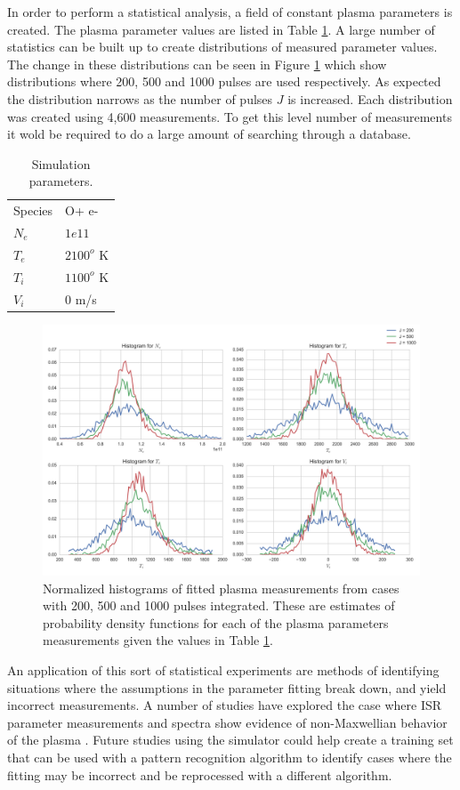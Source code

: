 \documentclass[draft,ras]{agutex}
\begin{document}
\begin{article}
In order to perform a statistical analysis, a field of constant plasma parameters is created. The plasma parameter values are listed in Table \ref{tb:param1}. A large number of statistics can be built up to create distributions of measured parameter values. The change in these distributions can be seen in Figure \ref{fig:statshistall} which show distributions where 200, 500 and 1000 pulses are used respectively. As expected the distribution narrows as the number of pulses $J$ is increased. Each distribution was created using 4,600 measurements. To get this level number of measurements it wold be required to do a large amount of searching through a database. 

\begin{table}[!t]
\centering
\caption{Simulation parameters.}
\label{tb:param1}
\begin{tabular}{ll}
Species & O+ e-\\
$N_e$    & $1e11$ \\
$T_e$      & $2100^o$ K   \\
$T_i$      & $1100^o$ K \\
$V_i$      & $0$ m/s
\end{tabular}
\end{table}

\begin{figure}[!t]
\centering
\includegraphics[width=5in]{datahist}
\caption{Normalized histograms of fitted plasma measurements from cases with 200, 500 and 1000 pulses integrated. These are estimates of probability density functions for each of the plasma parameters measurements given the values in Table \ref{tb:param1}.}
\label{fig:statshistall}
\end{figure}

An application of this sort of statistical experiments are methods of identifying situations where the assumptions in the parameter fitting break down, and yield incorrect measurements. A number of studies have explored the case where ISR parameter measurements and spectra show evidence of non-Maxwellian behavior of the plasma \citet{Akbari:2012dz,Akbari:2015fv}. Future studies using the simulator could help create a training set that can be used with a pattern recognition algorithm to identify cases where the fitting may be incorrect and be reprocessed with a different algorithm.


\end{article}
\end{document}
